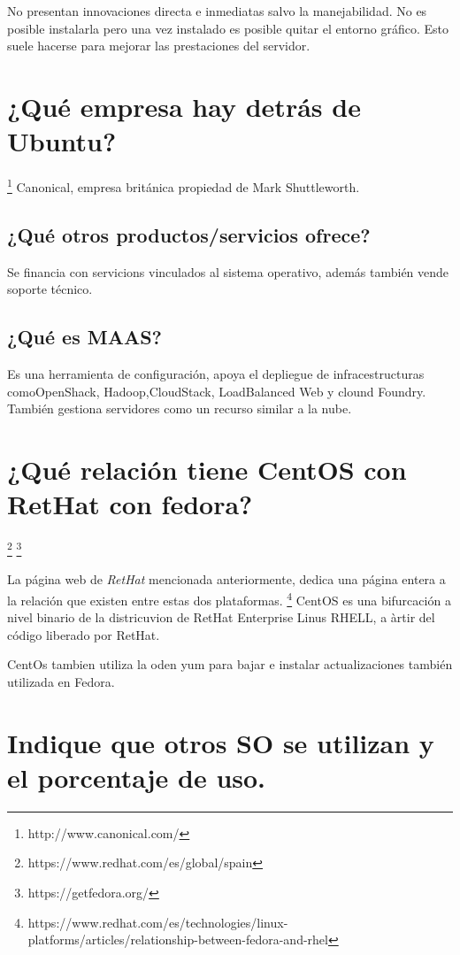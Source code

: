 No presentan innovaciones directa e inmediatas salvo la manejabilidad. No es posible instalarla pero una vez instalado es posible quitar el entorno gráfico. Esto suele hacerse para mejorar las prestaciones del servidor.


\section{¿Qué empresa hay detrás de Ubuntu?}
\footnote{http://www.canonical.com/}
Canonical, empresa británica propiedad de Mark Shuttleworth.

\subsection{¿Qué otros productos/servicios  ofrece?}

Se financia con servicions vinculados al sistema operativo, además también vende soporte técnico.



\subsection{¿Qué es MAAS?}

Es una herramienta de configuración, apoya el depliegue de infracestructuras comoOpenShack, Hadoop,CloudStack, LoadBalanced Web y clound Foundry. También gestiona servidores como un recurso similar a la nube.

\section{¿Qué relación tiene CentOS con RetHat  con fedora?}
\footnote{https://www.redhat.com/es/global/spain}
\footnote{https://getfedora.org/}

La página web de \textit{RetHat} mencionada anteriormente, dedica una página entera a la relación que existen entre estas dos plataformas. \footnote{https://www.redhat.com/es/technologies/linux-platforms/articles/relationship-between-fedora-and-rhel}
CentOS es una bifurcación a nivel binario de la districuvion de RetHat Enterprise Linus RHELL, a àrtir del código liberado por RetHat.

CentOs tambien utiliza la oden yum para bajar e instalar actualizaciones también utilizada en Fedora.


\section{Indique que otros SO se utilizan y el porcentaje de uso.}

